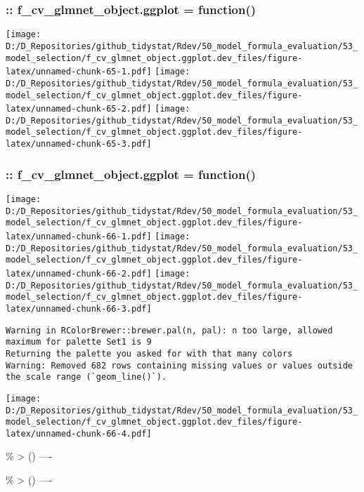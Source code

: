 \documentclass[
]{article}
\begin{document}
\hypertarget{f_cv_glmnet_object.ggplot-function-1}{%
\subsubsection{:: f\_cv\_glmnet\_object.ggplot =
function()}\label{f_cv_glmnet_object.ggplot-function-1}}

\texttt{[image: D:/D\_Repositories/github\_tidystat/Rdev/50\_model\_formula\_evaluation/53\_model\_selection/f\_cv\_glmnet\_object.ggplot.dev\_files/figure-latex/unnamed-chunk-65-1.pdf]}
\texttt{[image: D:/D\_Repositories/github\_tidystat/Rdev/50\_model\_formula\_evaluation/53\_model\_selection/f\_cv\_glmnet\_object.ggplot.dev\_files/figure-latex/unnamed-chunk-65-2.pdf]}
\texttt{[image: D:/D\_Repositories/github\_tidystat/Rdev/50\_model\_formula\_evaluation/53\_model\_selection/f\_cv\_glmnet\_object.ggplot.dev\_files/figure-latex/unnamed-chunk-65-3.pdf]}

\hypertarget{f_cv_glmnet_object.ggplot-function-2}{%
\subsubsection{:: f\_cv\_glmnet\_object.ggplot =
function()}\label{f_cv_glmnet_object.ggplot-function-2}}

\texttt{[image: D:/D\_Repositories/github\_tidystat/Rdev/50\_model\_formula\_evaluation/53\_model\_selection/f\_cv\_glmnet\_object.ggplot.dev\_files/figure-latex/unnamed-chunk-66-1.pdf]}
\texttt{[image: D:/D\_Repositories/github\_tidystat/Rdev/50\_model\_formula\_evaluation/53\_model\_selection/f\_cv\_glmnet\_object.ggplot.dev\_files/figure-latex/unnamed-chunk-66-2.pdf]}
\texttt{[image: D:/D\_Repositories/github\_tidystat/Rdev/50\_model\_formula\_evaluation/53\_model\_selection/f\_cv\_glmnet\_object.ggplot.dev\_files/figure-latex/unnamed-chunk-66-3.pdf]}

\begin{verbatim}
Warning in RColorBrewer::brewer.pal(n, pal): n too large, allowed maximum for palette Set1 is 9
Returning the palette you asked for with that many colors
Warning: Removed 682 rows containing missing values or values outside the scale range (`geom_line()`).
\end{verbatim}

\texttt{[image: D:/D\_Repositories/github\_tidystat/Rdev/50\_model\_formula\_evaluation/53\_model\_selection/f\_cv\_glmnet\_object.ggplot.dev\_files/figure-latex/unnamed-chunk-66-4.pdf]}

\% \textbar\textgreater{} () ----

\% \textbar\textgreater{} () ----
\end{document}
